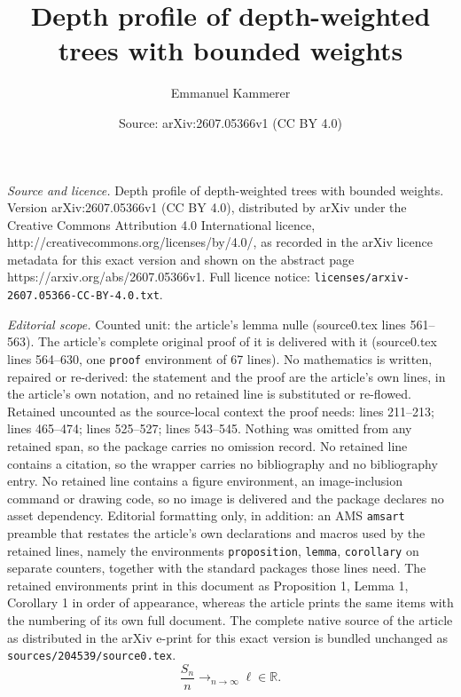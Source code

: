 \documentclass[10pt,a4paper]{amsart}
\title{Depth profile of depth-weighted trees with bounded weights}
\author{Emmanuel Kammerer}
\date{Source: arXiv:2607.05366v1 (CC BY 4.0)}
\def \R{\mathbb {R}}
\begin{document}
\maketitle

\noindent\emph{Source and licence.} Depth profile of depth-weighted trees with bounded weights. Version arXiv:2607.05366v1 (CC BY 4.0), distributed by arXiv under the Creative Commons Attribution 4.0 International licence, http://creativecommons.org/licenses/by/4.0/, as recorded in the arXiv licence metadata for this exact version and shown on the abstract page https://arxiv.org/abs/2607.05366v1. Full licence notice: \texttt{licenses/arxiv-2607.05366-CC-BY-4.0.txt}.\par\smallskip

\noindent\textit{Editorial scope.} Counted unit: the article's lemma nulle (source0.tex lines 561--563). The article's complete original proof of it is delivered with it (source0.tex lines 564--630, one \texttt{proof} environment of 67 lines). No mathematics is written, repaired or re-derived: the statement and the proof are the article's own lines, in the article's own notation, and no retained line is substituted or re-flowed.  Retained uncounted as the source-local context the proof needs: lines 211--213; lines 465--474; lines 525--527; lines 543--545.  Nothing was omitted from any retained span, so the package carries no omission record.  No retained line contains a citation, so the wrapper carries no bibliography and no bibliography entry.  No retained line contains a figure environment, an image-inclusion command or drawing code, so no image is delivered and the package declares no asset dependency.  Editorial formatting only, in addition: an AMS \texttt{amsart} preamble that restates the article's own declarations and macros used by the retained lines, namely the environments \texttt{proposition}, \texttt{lemma}, \texttt{corollary} on separate counters, together with the standard packages those lines need.  The retained environments print in this document as Proposition 1, Lemma 1, Corollary 1 in order of appearance, whereas the article prints the same items with the numbering of its own full document.  The complete native source of the article as distributed in the arXiv e-print for this exact version is bundled unchanged as \texttt{sources/204539/source0.tex}.
\begin{equation}\label{condition ergodicite}
	\frac{S_n}{n} \mathop{\longrightarrow}_{n\to \infty} \ell \in \R.
\end{equation}
\end{document}
